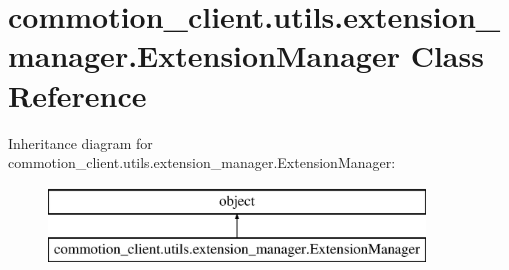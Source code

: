 \hypertarget{classcommotion__client_1_1utils_1_1extension__manager_1_1ExtensionManager}{\section{commotion\-\_\-client.\-utils.\-extension\-\_\-manager.\-Extension\-Manager Class Reference}
\label{classcommotion__client_1_1utils_1_1extension__manager_1_1ExtensionManager}
}
Inheritance diagram for commotion\-\_\-client.\-utils.\-extension\-\_\-manager.\-Extension\-Manager\-:\begin{figure}[H]
\begin{center}
\leavevmode
\includegraphics[height=2.000000cm]{classcommotion__client_1_1utils_1_1extension__manager_1_1ExtensionManager}
\end{center}
\end{figure}
